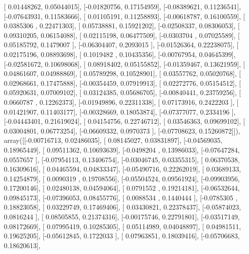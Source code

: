 \documentclass{article}
\begin{document}
       [ 0.01448262,  0.05044015],
       [-0.01820756,  0.17154959],
       [-0.08389621,  0.11236541],
       [-0.07643931,  0.11583666],
       [ 0.01105191,  0.11258893],
       [-0.00618787,  0.16100559],
       [ 0.0385306 ,  0.22471303],
       [ 0.05738881,  0.15921202],
       [-0.02508337,  0.08306053],
       [ 0.09310205,  0.06154088],
       [ 0.02115198,  0.06477509],
       [-0.0303704 ,  0.07025589],
       [ 0.05185792,  0.1479007 ],
       [-0.06304407,  0.2093015 ],
       [-0.01526364,  0.22238075],
       [ 0.02175196,  0.08893698],
       [ 0.1019482 ,  0.10435356],
       [-0.00767954,  0.04645399],
       [-0.02581672,  0.10698068],
       [ 0.08918402,  0.05155852],
       [-0.01359467,  0.13621959],
       [ 0.04861607,  0.04988869],
       [ 0.05789298,  0.10528901],
       [ 0.03557762,  0.05020768],
       [ 0.02968661,  0.17475888],
       [-0.00354459,  0.07919913],
       [ 0.02272776,  0.05154512],
       [ 0.05920631,  0.07009102],
       [ 0.03124385,  0.05686705],
       [-0.00840441,  0.23759256],
       [ 0.0660787 ,  0.12262373],
       [-0.01949896,  0.22311338],
       [ 0.07173916,  0.2422203 ],
       [ 0.01421907,  0.11403177],
       [-0.00328669,  0.18053874],
       [-0.07377077,  0.2334196 ],
       [-0.04443401,  0.21619024],
       [ 0.04154756,  0.22746712],
       [ 0.03546363,  0.09699102],
       [ 0.03004801,  0.06773254],
       [-0.06609332,  0.0970373 ],
       [-0.07708623,  0.15260872]]), array([[-0.00716713,  0.02486035],
       [ 0.08145027,  0.03831897],
       [-0.04569035,  0.18965449],
       [ 0.09511362,  0.10693639],
       [-0.0498204 ,  0.13986033],
       [-0.07647284,  0.0557657 ],
       [-0.07954113,  0.13406754],
       [-0.03046745,  0.03355315],
       [ 0.06370538,  0.16309616],
       [ 0.04465594,  0.04833347],
       [-0.05490716,  0.22262019],
       [ 0.03689133,  0.14254879],
       [ 0.0090319 ,  0.19708556],
       [-0.05504524,  0.09561924],
       [-0.09903956,  0.17200146],
       [ 0.02480138,  0.04594064],
       [ 0.0791552 ,  0.19214181],
       [-0.06532644,  0.09845173],
       [-0.07396053,  0.08455776],
       [ 0.0088534 ,  0.1440444 ],
       [-0.0785305 ,  0.18823058],
       [ 0.03229749,  0.17469406],
       [ 0.03430821,  0.22378437],
       [-0.05874023,  0.0816244 ],
       [ 0.08505855,  0.21374316],
       [-0.00175746,  0.22791801],
       [-0.03517149,  0.08172669],
       [ 0.07995419,  0.10285305],
       [ 0.05114989,  0.04048897],
       [ 0.04981511,  0.19625205],
       [-0.05612845,  0.1722033 ],
       [ 0.07963851,  0.18039416],
       [-0.05706683,  0.18620613],
\end{document}
